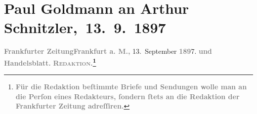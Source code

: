 

         
         \renewcommand{\erwaehntePersonen}{Personen:  ?? [Totgeborener Sohn von Arthur Schnitzler und Marie Reinhard], Richard Beer-Hofmann, Mirjam Beer-Hofmann, Paula Beer-Hofmann, Rosa Freudenthal, Hermann Freudenthal, Marie Reinhard, Josef Rosengart}
         \renewcommand{\erwaehnteInstitutionen}{Institutionen: Frankfurter Zeitung, Houghton Library}
         \renewcommand{\erwaehnteOrte}{Orte: Frankfurt am Main, Paris, Rossertstraße, Wien}
         \renewcommand{\erwaehnteWerke}{}
               \section[ Paul Goldmann an Arthur Schnitzler, 13. 9. 1897]{ Paul Goldmann an Arthur Schnitzler, 13. 9. 1897}\nopagebreak{}\rehead{ }\begin{ledgroupsized}[t]{13cm}\normalsize\beginnumbering \toendnotes[C]{\smallbreak\pagebreak[2]} 
\toendnotes[C]{\smallbreak}\pstart
           \noindent{}{\pb}\textcolor{gray}{\textbf{Frankfurter Zeitung}}\hfill \textcolor{gray}{\textbf{Frankfurt a. M.,}}{ }13. September \textcolor{gray}{\textbf{189}}7.\pend
           \pstart
           \textcolor{gray}{\textbf{und}}\pend
           \pstart
           \textcolor{gray}{\textbf{Handelsblatt.}}\pend
           \pstart
           \textcolor{gray}{\textbf{\textsc{Redaktion.\footnote{\noindent{}\textcolor{gray}{\textbf{Für die Redaktion beſtimmte Briefe und Sendungen wolle
                                 man  an die Perſon eines
                                 Redakteurs, ſondern ſtets \textbf{an die Redaktion der Frankfurter Zeitung} adreſſiren.}}}}}}\pend

\end{ledgroupsized}
